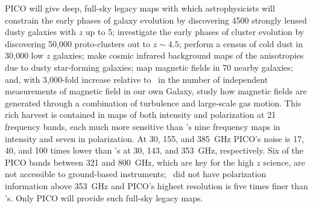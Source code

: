 \documentclass[PICOReport.tex]{subfiles}
\begin{document}
PICO will give deep, full-sky legacy maps with which astrophysicists will constrain the early phases of galaxy evolution by discovering 4500 strongly lensed dusty galaxies with $z$ up to 5; investigate the early phases of cluster evolution by discovering 50,000 proto-clusters out to $z\sim4.5$; perform a census of cold dust in 30,000 low $z$ galaxies; make cosmic infrared background maps of the anisotropies due to dusty star-forming galaxies; map magnetic fields in 70 nearby galaxies; and, with 3,000-fold increase relative to \planck\ in the number of independent measurements of magnetic field in our own Galaxy, study how magnetic fields are generated through a combination of turbulence and large-scale gas motion. This rich harvest is contained in maps of both intensity and polarization at 21 frequency bands, each much more sensitive than \planck 's nine frequency maps in intensity and seven in polarization. At 30, 155, and 385~GHz PICO's noise is 17, 40, and 100 times lower than \planck 's at 30, 143, and 353~GHz, respectively. Six of the PICO bands between 321 and 800~GHz, which are key for the high $z$ science, are not accessible to ground-based instruments; \planck\ did not have polarization information above 353~GHz and PICO's highest resolution is five times finer than \planck 's. Only PICO will provide such full-sky legacy maps. 

\end{document}
